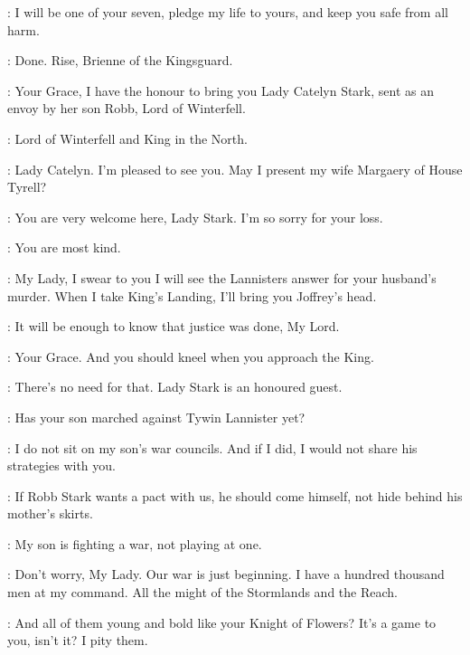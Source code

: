 \BRIENNE: I will be one of your seven, pledge my life to yours, and keep you safe from all harm. 

\RENLY: Done. Rise, Brienne of the Kingsguard. 


\COLEN: Your Grace, I have the honour to bring you Lady Catelyn Stark, sent as an envoy by her son Robb, Lord of Winterfell. 

\CATELYN: Lord of Winterfell and King in the North. 

\RENLY: Lady Catelyn. I'm pleased to see you. May I present my wife Margaery of House Tyrell? 

\MARGAERY: You are very welcome here, Lady Stark. I'm so sorry for your loss. 

\CATELYN: You are most kind. 

\RENLY: My Lady, I swear to you I will see the Lannisters answer for your husband's murder. When I take King's Landing, I'll bring you Joffrey's head. 


\CATELYN: It will be enough to know that justice was done, My Lord. 

\BRIENNE: Your Grace. And you should kneel when you approach the King. 

\RENLY: There's no need for that. Lady Stark is an honoured guest. 

\LORAS: Has your son marched against Tywin Lannister yet? 

\CATELYN: I do not sit on my son's war councils. And if I did, I would not share his strategies with you. 

\LORAS: If Robb Stark wants a pact with us, he should come himself, not hide behind his mother's skirts. 

\CATELYN: My son is fighting a war, not playing at one. 



\RENLY: Don't worry, My Lady. Our war is just beginning. I have a hundred thousand men at my command. All the might of the Stormlands and the Reach. 

\CATELYN: And all of them young and bold like your Knight of Flowers? It's a game to you, isn't it? I pity them. 

